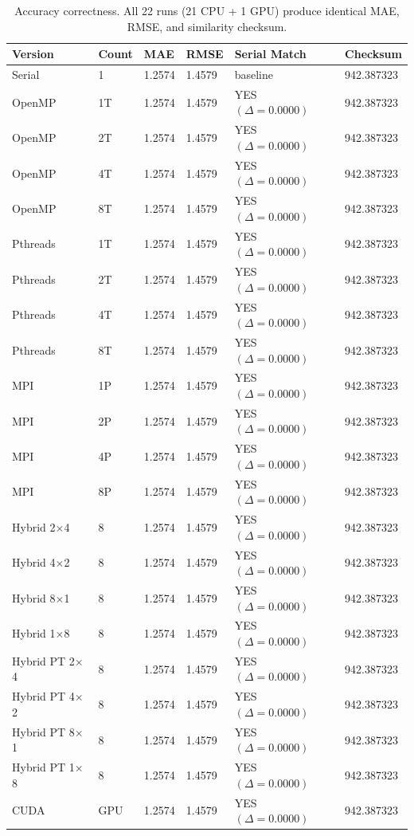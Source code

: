 \documentclass[11pt,a4paper]{article}
\begin{document}
\begin{table}[!htbp]
\centering
\small
\begin{tabular}{L{2.5cm} C{1.45cm} C{1.2cm} C{1.45cm} C{2.8cm} R{2.5cm}}
\toprule
\textbf{Version} & \textbf{Count} & \textbf{MAE} & \textbf{RMSE} &
\textbf{Serial Match} & \textbf{Checksum} \\
\midrule
Serial         & 1   & 1.2574 & 1.4579 & baseline                & 942.387323 \\
OpenMP         & 1T  & 1.2574 & 1.4579 & YES $(\Delta=0.0000)$   & 942.387323 \\
OpenMP         & 2T  & 1.2574 & 1.4579 & YES $(\Delta=0.0000)$   & 942.387323 \\
OpenMP         & 4T  & 1.2574 & 1.4579 & YES $(\Delta=0.0000)$   & 942.387323 \\
OpenMP         & 8T  & 1.2574 & 1.4579 & YES $(\Delta=0.0000)$   & 942.387323 \\
Pthreads       & 1T  & 1.2574 & 1.4579 & YES $(\Delta=0.0000)$   & 942.387323 \\
Pthreads       & 2T  & 1.2574 & 1.4579 & YES $(\Delta=0.0000)$   & 942.387323 \\
Pthreads       & 4T  & 1.2574 & 1.4579 & YES $(\Delta=0.0000)$   & 942.387323 \\
Pthreads       & 8T  & 1.2574 & 1.4579 & YES $(\Delta=0.0000)$   & 942.387323 \\
MPI            & 1P  & 1.2574 & 1.4579 & YES $(\Delta=0.0000)$   & 942.387323 \\
MPI            & 2P  & 1.2574 & 1.4579 & YES $(\Delta=0.0000)$   & 942.387323 \\
MPI            & 4P  & 1.2574 & 1.4579 & YES $(\Delta=0.0000)$   & 942.387323 \\
MPI            & 8P  & 1.2574 & 1.4579 & YES $(\Delta=0.0000)$   & 942.387323 \\
Hybrid 2$\times$4   & 8 & 1.2574 & 1.4579 & YES $(\Delta=0.0000)$ & 942.387323 \\
Hybrid 4$\times$2   & 8 & 1.2574 & 1.4579 & YES $(\Delta=0.0000)$ & 942.387323 \\
Hybrid 8$\times$1   & 8 & 1.2574 & 1.4579 & YES $(\Delta=0.0000)$ & 942.387323 \\
Hybrid 1$\times$8   & 8 & 1.2574 & 1.4579 & YES $(\Delta=0.0000)$ & 942.387323 \\
Hybrid PT 2$\times$4 & 8 & 1.2574 & 1.4579 & YES $(\Delta=0.0000)$ & 942.387323 \\
Hybrid PT 4$\times$2 & 8 & 1.2574 & 1.4579 & YES $(\Delta=0.0000)$ & 942.387323 \\
Hybrid PT 8$\times$1 & 8 & 1.2574 & 1.4579 & YES $(\Delta=0.0000)$ & 942.387323 \\
Hybrid PT 1$\times$8 & 8 & 1.2574 & 1.4579 & YES $(\Delta=0.0000)$ & 942.387323 \\
CUDA           & GPU & 1.2574 & 1.4579 & YES $(\Delta=0.0000)$   & 942.387323 \\
\bottomrule
\end{tabular}
\caption{Accuracy correctness. All 22 runs (21 CPU + 1 GPU) produce identical
MAE, RMSE, and similarity checksum.}
\label{tab:acc}
\end{table}
\end{document}
